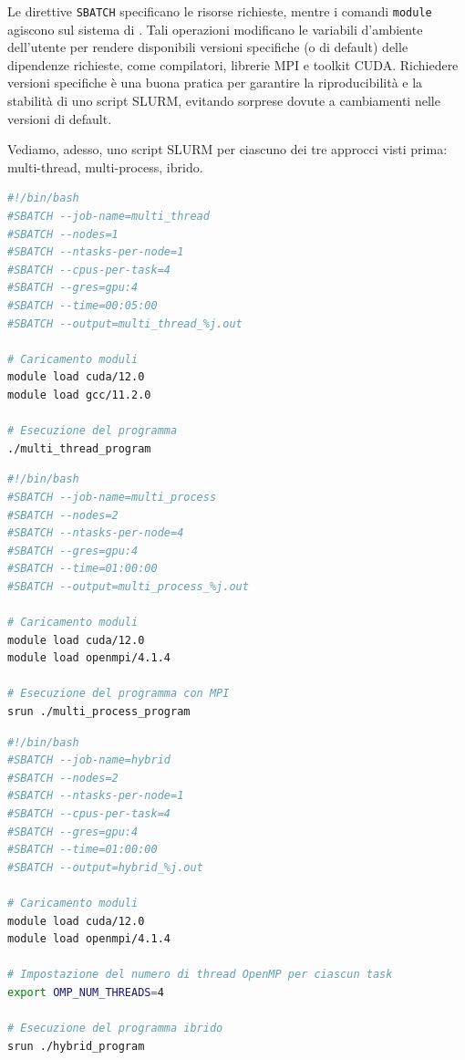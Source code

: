 Le direttive \texttt{SBATCH} specificano le risorse richieste, mentre i comandi \texttt{module} agiscono sul sistema di .
Tali operazioni modificano le variabili d'ambiente dell'utente per rendere disponibili versioni specifiche (o di default) delle dipendenze richieste, come compilatori, librerie MPI e toolkit CUDA. 
Richiedere versioni specifiche è una buona pratica per garantire la riproducibilità e la stabilità di uno script SLURM, evitando sorprese dovute a cambiamenti nelle versioni di default.

Vediamo, adesso, uno script SLURM per ciascuno dei tre approcci visti prima: multi-thread, multi-process, ibrido.

\begin{lstlisting}[language=bash, caption={Script SLURM per approccio multi-thread (singolo nodo). In questo caso, poichè il programma esegue su un solo nodo, è possibile lanciare direttamente l'eseguibile, senza \texttt{srun}.}]
#!/bin/bash
#SBATCH --job-name=multi_thread
#SBATCH --nodes=1
#SBATCH --ntasks-per-node=1
#SBATCH --cpus-per-task=4
#SBATCH --gres=gpu:4
#SBATCH --time=00:05:00
#SBATCH --output=multi_thread_%j.out

# Caricamento moduli
module load cuda/12.0
module load gcc/11.2.0

# Esecuzione del programma
./multi_thread_program
\end{lstlisting}

\begin{lstlisting}[language=bash, caption={Script SLURM per approccio multi-process (2 nodi, 8 task)}]
#!/bin/bash
#SBATCH --job-name=multi_process
#SBATCH --nodes=2
#SBATCH --ntasks-per-node=4
#SBATCH --gres=gpu:4
#SBATCH --time=01:00:00
#SBATCH --output=multi_process_%j.out

# Caricamento moduli
module load cuda/12.0
module load openmpi/4.1.4

# Esecuzione del programma con MPI
srun ./multi_process_program
\end{lstlisting}

\begin{lstlisting}[language=bash, caption={Script SLURM per approccio ibrido (2 nodi, 2 task MPI, 4 thread per task)}]
#!/bin/bash
#SBATCH --job-name=hybrid
#SBATCH --nodes=2
#SBATCH --ntasks-per-node=1
#SBATCH --cpus-per-task=4
#SBATCH --gres=gpu:4
#SBATCH --time=01:00:00
#SBATCH --output=hybrid_%j.out

# Caricamento moduli
module load cuda/12.0
module load openmpi/4.1.4

# Impostazione del numero di thread OpenMP per ciascun task
export OMP_NUM_THREADS=4

# Esecuzione del programma ibrido
srun ./hybrid_program
\end{lstlisting}

